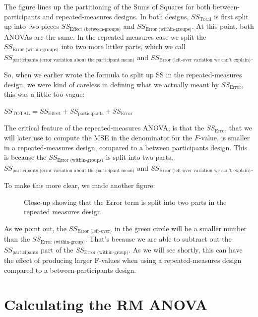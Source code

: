 \documentclass[
]{book}
\makeatletter
\newcommand*\pandocbounded[1]{%
  \sbox\pandoc@box{#1}%
  \Gscale@div\@tempa{\textheight}{\dimexpr\ht\pandoc@box+\dp\pandoc@box\relax}%
  \Gscale@div\@tempb{\linewidth}{\wd\pandoc@box}%
  \ifdim\@tempb\p@<\@tempa\p@\let\@tempa\@tempb\fi%
  \ifdim\@tempa\p@<\p@\scalebox{\@tempa}{\usebox\pandoc@box}%
  \else\usebox{\pandoc@box}%
  \fi%
}
\makeatother
\begin{document}
The figure lines up the partitioning of the Sums of Squares for both between-participants and repeated-measures designs. In both designs, \(SS_\text{Total}\) is first split up into two pieces \(SS_\text{Effect (between-groups)}\) and \(SS_\text{Error (within-groups)}\). At this point, both ANOVAs are the same. In the repeated measures case we split the \(SS_\text{Error (within-groups)}\) into two more littler parts, which we call \(SS_\text{participants (error variation about the participant mean)}\) and \(SS_\text{Error (left-over variation we can't explain)}\).

So, when we earlier wrote the formula to split up SS in the repeated-measures design, we were kind of careless in defining what we actually meant by \(SS_\text{Error}\), this was a little too vague:

\(SS_\text{TOTAL} = SS_\text{Effect} + SS_\text{participants} +SS_\text{Error}\)

The critical feature of the repeated-measures ANOVA, is that the \(SS_\text{Error}\) that we will later use to compute the MSE in the denominator for the \(F\)-value, is smaller in a repeated-measures design, compared to a between participants design. This is because the \(SS_\text{Error (within-groups)}\) is split into two parts, \(SS_\text{participants (error variation about the participant mean)}\) and \(SS_\text{Error (left-over variation we can't explain)}\).

To make this more clear, we made another figure:

\begin{figure}
\centering
\pandocbounded{\texttt{[image: figures/SS\_RMANOVA.png]}}
\caption{\label{fig:8moresplit}Close-up showing that the Error term is split into two parts in the repeated measures design}
\end{figure}

As we point out, the \(SS_\text{Error (left-over)}\) in the green circle will be a smaller number than the \(SS_\text{Error (within-group)}\). That's because we are able to subtract out the \(SS_\text{participants}\) part of the \(SS_\text{Error (within-group)}\). As we will see shortly, this can have the effect of producing larger F-values when using a repeated-measures design compared to a between-participants design.

\section{Calculating the RM ANOVA}\label{calculating-the-rm-anova}
\end{document}
